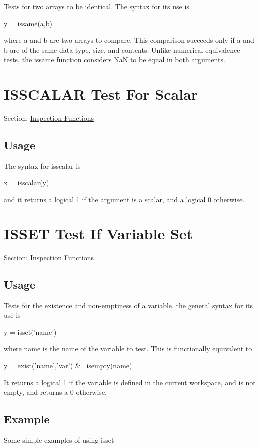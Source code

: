 Tests for two arrays to be identical. The syntax for its use is \begin{DoxyVerb}   y = issame(a,b)
\end{DoxyVerb}
 where {\ttfamily a} and {\ttfamily b} are two arrays to compare. This comparison succeeds only if {\ttfamily a} and {\ttfamily b} are of the same data type, size, and contents. Unlike numerical equivalence tests, the {\ttfamily issame} function considers {\ttfamily Na\-N} to be equal in both arguments. \hypertarget{inspection_isscalar}{}\section{I\-S\-S\-C\-A\-L\-A\-R Test For Scalar}\label{inspection_isscalar}
Section\-: \hyperlink{sec_inspection}{Inspection Functions} \hypertarget{vtkwidgets_vtkxyplotwidget_Usage}{}\subsection{Usage}\label{vtkwidgets_vtkxyplotwidget_Usage}
The syntax for {\ttfamily isscalar} is \begin{DoxyVerb}   x = isscalar(y)
\end{DoxyVerb}
 and it returns a logical 1 if the argument is a scalar, and a logical 0 otherwise. \hypertarget{inspection_isset}{}\section{I\-S\-S\-E\-T Test If Variable Set}\label{inspection_isset}
Section\-: \hyperlink{sec_inspection}{Inspection Functions} \hypertarget{vtkwidgets_vtkxyplotwidget_Usage}{}\subsection{Usage}\label{vtkwidgets_vtkxyplotwidget_Usage}
Tests for the existence and non-\/emptiness of a variable. the general syntax for its use is \begin{DoxyVerb}   y = isset('name')
\end{DoxyVerb}
 where {\ttfamily name} is the name of the variable to test. This is functionally equivalent to \begin{DoxyVerb}   y = exist('name','var') & ~isempty(name)
\end{DoxyVerb}
 It returns a {\ttfamily logical} 1 if the variable is defined in the current workspace, and is not empty, and returns a 0 otherwise. \hypertarget{variables_struct_Example}{}\subsection{Example}\label{variables_struct_Example}
Some simple examples of using {\ttfamily isset}


